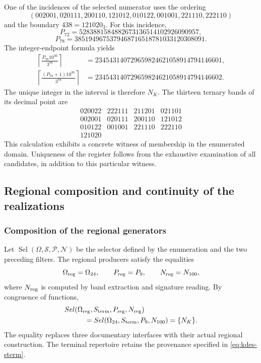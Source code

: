One of the incidences of the selected numerator uses the ordering
\[
 (002001,020111,200110,121012,010122,001001,221110,222110)
\]
and the boundary $438=121020_3$. For this incidence,
\[
 P_{72}=5283881584882673136514102926090957,
\]
\[
 P_{78}=3851949675379468716518781033120308091.
\]
The integer-endpoint formula yields
\begin{align*}
 \left\lceil\frac{P_{78}10^{36}}{3^{78}}\right\rceil
 &=234543140729659824621058914794146601,\\
 \left\lceil\frac{(P_{78}+1)10^{36}}{3^{78}}\right\rceil
 &=234543140729659824621058914794146602.
\end{align*}
The unique integer in the interval is therefore $N_K$. The thirteen ternary
bands of its decimal point are
\[
 \begin{array}{rrrr}
 020022&222111&211201&021101\\
 002001&020111&200110&121012\\
 010122&001001&221110&222110\\
 121020&&&
 \end{array}
\]
This calculation exhibits a concrete witness of membership in the enumerated
domain. Uniqueness of the register follows from the exhaustive examination of
all candidates, in addition to this particular witness.

\subsection{Regional composition and continuity of the realizations}

\subsubsection{Composition of the regional generators}

Let $\operatorname{Sel}(\Omega,\mathcal S,\mathcal P,\mathcal N)$ be the
selector defined by the enumeration and the two preceding filters.
The regional producers satisfy the equalities
\[
 \Omega_{\rm reg}=\Omega_{24},\qquad
 \mathcal P_{\rm reg}=\mathcal P_9,\qquad
 \mathcal N_{\rm reg}=\mathcal N_{100},
\]
where $\mathcal N_{\rm reg}$ is computed by band extraction and
signature reading. By congruence of functions,
\begin{equation}
 \begin{split}
 &\operatorname{Sel}(\Omega_{\rm reg},\mathcal S_{\rm term},
                    \mathcal P_{\rm reg},\mathcal N_{\rm reg})\\
 &\hspace{10mm}=
 \operatorname{Sel}(\Omega_{24},\mathcal S_{\rm term},
                    \mathcal P_9,\mathcal N_{100})=\{N_K\}.
 \end{split}
 \label{eq:kdes-composicion}
\end{equation}
The equality replaces three documentary interfaces with their actual
regional construction. The terminal repertoire retains the provenance
specified in \eqref{eq:kdes-sterm}.

